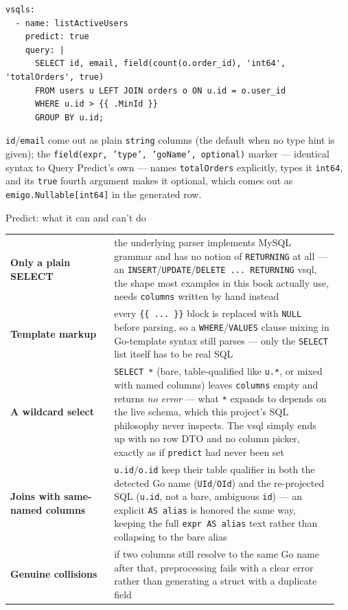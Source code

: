 \begin{lstlisting}
vsqls:
  - name: listActiveUsers
    predict: true
    query: |
      SELECT id, email, field(count(o.order_id), 'int64', 'totalOrders', true)
      FROM users u LEFT JOIN orders o ON u.id = o.user_id
      WHERE u.id > {{ .MinId }}
      GROUP BY u.id;
\end{lstlisting}

\texttt{id}/\texttt{email} come out as plain \texttt{string} columns
(the default when no type hint is given); the \texttt{field(expr,
'type', 'goName', optional)} marker --- identical syntax to Query
Predict's own --- names \texttt{totalOrders} explicitly, types it
\texttt{int64}, and its \texttt{true} fourth argument makes it
optional, which comes out as \texttt{emigo.Nullable[int64]} in the
generated row.

\begin{sidebar}{Predict: what it can and can't do}
\small
\begin{tabular}{@{}p{0.3\linewidth}p{0.65\linewidth}@{}}
\textbf{Only a plain SELECT} & the underlying parser implements MySQL grammar and has no notion of \texttt{RETURNING} at all --- an \texttt{INSERT}/\texttt{UPDATE}/\texttt{DELETE ... RETURNING} vsql, the shape most examples in this book actually use, needs \texttt{columns} written by hand instead \\
\textbf{Template markup} & every \texttt{\{\{ ... \}\}} block is replaced with \texttt{NULL} before parsing, so a \texttt{WHERE}/\texttt{VALUES} clause mixing in Go-template syntax still parses --- only the \texttt{SELECT} list itself has to be real SQL \\
\textbf{A wildcard select} & \texttt{SELECT *} (bare, table-qualified like \texttt{u.*}, or mixed with named columns) leaves \texttt{columns} empty and returns \emph{no error} --- what \texttt{*} expands to depends on the live schema, which this project's SQL philosophy never inspects. The vsql simply ends up with no row DTO and no column picker, exactly as if \texttt{predict} had never been set \\
\textbf{Joins with same-named columns} & \texttt{u.id}/\texttt{o.id} keep their table qualifier in both the detected Go name (\texttt{UId}/\texttt{OId}) and the re-projected SQL (\texttt{u.id}, not a bare, ambiguous \texttt{id}) --- an explicit \texttt{AS alias} is honored the same way, keeping the full \texttt{expr AS alias} text rather than collapsing to the bare alias \\
\textbf{Genuine collisions} & if two columns still resolve to the same Go name after that, preprocessing fails with a clear error rather than generating a struct with a duplicate field \\
\end{tabular}
\end{sidebar}

